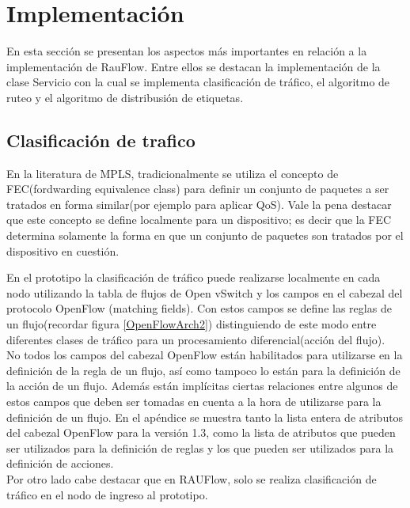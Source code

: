 \section[Implementaci\'on]{Implementaci\'on}

En esta secci\'on se presentan los aspectos m\'as importantes en relaci\'on a la implementaci\'on de RauFlow. Entre ellos se destacan la implementaci\'on de la clase Servicio con la cual se implementa  clasificaci\'on de tr\'afico, el algoritmo de ruteo y el algoritmo de distribusi\'on de etiquetas.\\

\subsection{Clasificación de trafico}
En la literatura de MPLS, tradicionalmente se utiliza el concepto de FEC(fordwarding equivalence class) para definir un conjunto de paquetes a ser tratados en forma similar(por ejemplo para aplicar QoS). Vale la pena destacar que este concepto se define localmente para un dispositivo; es decir que la FEC determina solamente la forma en que un conjunto de paquetes son tratados por el dispositivo en cuesti\'on.

En el prototipo la clasificaci\'on de tr\'afico puede realizarse localmente en cada nodo utilizando la tabla de flujos de Open vSwitch y los campos en el cabezal del protocolo OpenFlow (matching fields). Con estos campos se define las reglas de un flujo(recordar figura \ref{OpenFlowArch2}) distinguiendo de este modo entre diferentes clases de tr\'afico para un procesamiento diferencial(acci\'on del flujo).\\

No todos los campos del cabezal OpenFlow están habilitados para utilizarse en la definici\'on de la regla de un flujo, así como tampoco lo están para la definici\'on de la acci\'on de un flujo. Adem\'as est\'an implícitas ciertas relaciones entre algunos de estos campos que deben ser tomadas en cuenta a la hora de utilizarse para la definici\'on de un flujo. En el ap\'endice se muestra tanto la lista entera de atributos del cabezal OpenFlow para la versi\'on 1.3, como la lista de atributos que pueden ser utilizados para la definici\'on de reglas y los que pueden ser utilizados para la definici\'on de acciones.\\

Por otro lado cabe destacar que en RAUFlow, solo se realiza clasificaci\'on de tr\'afico en el nodo de ingreso al prototipo.

